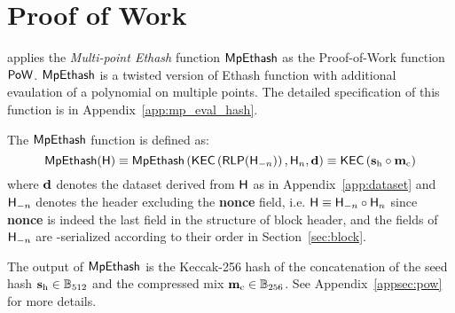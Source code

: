 
\section{Proof of Work}
\label{sec:pow}





{\name} applies the \emph{Multi-point Ethash} function $\mathsf{MpEthash}$
as the Proof-of-Work function $\mathsf{PoW}$.
$\mathsf{MpEthash}$ is a twisted version of \textsf{Ethash} function with additional evaulation of a polynomial on multiple points.
The detailed specification of this function is in Appendix~\ref{app:mp_eval_hash}.

The $\mathsf{MpEthash}$ function is defined as:
\begin{equation}\label{eq:mpethash}
	\mathsf{MpEthash}(\textsf{H})
	\equiv \mathsf{MpEthash}\left(\mathsf{KEC}\left(\mathsf{RLP}( \textsf{H}_{-n} )\right), \textsf{H}_{n},\mathbf{d}\right) 
	\equiv 
	 \mathsf{KEC}\left(\mathbf{s}_{\mathrm{h}} \circ \mathbf{m}_{\mathrm{c}} \right)
\end{equation}
where $\mathbf{d}$ denotes the dataset derived from $\textsf{H}$ as in Appendix~\ref{app:dataset} and $\textsf{H}_{-n}$ denotes the header excluding the {\bf nonce} field,
i.e. $\textsf{H} \equiv \textsf{H}_{-n} \circ \textsf{H}_n$ since {\bf nonce} is indeed the last field in the structure of block header,
and the fields of $\textsf{H}_{-n}$ are \rlp-serialized according to their order in Section~\ref{sec:block}. 

The output of $\mathsf{MpEthash}$ is the Keccak-256 hash of the concatenation of the seed hash $\mathbf{s}_{\mathrm{h}}\in \mathbb{B}_{512}$ and the compressed mix $\mathbf{m}_{\mathrm{c}}\in \mathbb{B}_{256}$.
See Appendix~\ref{appsec:pow} for more details.

